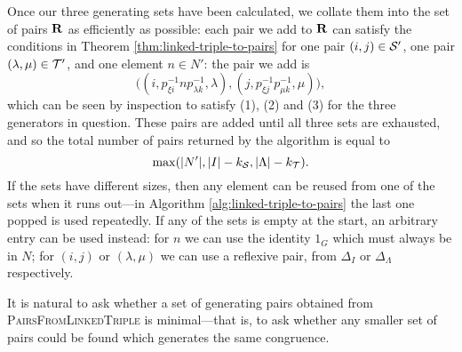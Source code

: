Once our three generating sets have been calculated, we collate them into the
set of pairs $\mathbf{R}$ as efficiently as possible: each pair we add to $\mathbf{R}$ can
satisfy the conditions in Theorem \ref{thm:linked-triple-to-pairs} for one pair
$(i,j) \in \mathcal{S}'$, one pair $(\lambda, \mu) \in \mathcal{T}'$, and one element
$n \in N'$: the pair we add is
$$\big((i, p_{\xi i}^{-1}np_{\lambda k}^{-1}, \lambda),
(j, p_{\xi j}^{-1}p_{\mu k}^{-1}, \mu)\big),$$
which can be seen by inspection to satisfy (1), (2) and (3) for the three
generators in question.  These pairs are added until all three sets are
exhausted, and so the total number of pairs returned by the algorithm is equal
to
$$\max(|N'|, |I| - k_{\mathcal{S}}, |\Lambda| - k_{\mathcal{T}}).$$
If the sets have different sizes, then any element can be reused from one of
the sets when it runs out---in Algorithm \ref{alg:linked-triple-to-pairs} the
last one popped is used repeatedly.  If any of the sets is empty at the
start, an arbitrary entry can be used instead: for $n$ we can use the identity
$1_G$ which must always be in $N$; for $(i,j)$ or $(\lambda,\mu)$ we can use a
reflexive pair, from $\Delta_I$ or $\Delta_\Lambda$ respectively.

It is natural to ask whether a set of generating pairs obtained from
\textsc{PairsFromLinkedTriple} is minimal---that is, to ask whether
any smaller set of pairs could be found which generates the same congruence.

